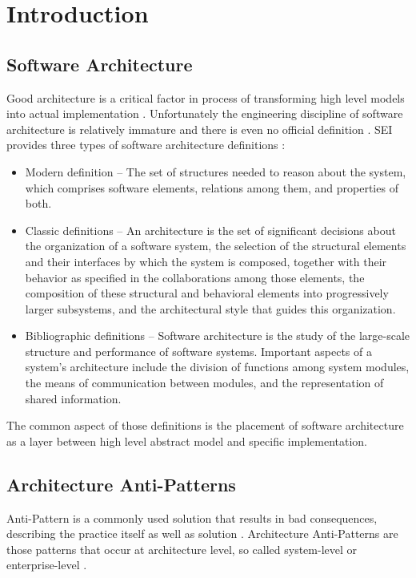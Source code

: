 \section{Introduction}


\subsection{Software Architecture}

Good architecture is a critical factor in process of transforming high level models into actual implementation \cite{Nordic}. Unfortunately the engineering discipline of software architecture is relatively immature and there is even no official definition \cite{ArchitekturaWikiPl}.
SEI provides three types of software architecture definitions \cite{SEI}:
\begin{itemize}
    \item Modern definition -- The set of structures needed to reason about the system, which comprises software elements, relations among them, and properties of both.
    \item Classic definitions -- An architecture is the set of significant decisions about the organization of a software system, the selection of the structural elements and their interfaces by which the system is composed, together with their behavior as specified in the collaborations among those elements, the composition of these structural and behavioral elements into progressively larger subsystems, and the architectural style that guides this organization.
    \item Bibliographic definitions -- Software architecture is the study of the large-scale structure and performance of software systems. Important aspects of a system's architecture include the division of functions among system modules, the means of communication between modules, and the representation of shared information.
\end{itemize}
The common aspect of those definitions is the placement of software architecture as a layer between high level abstract model and specific implementation.


\subsection{Architecture Anti-Patterns}

Anti-Pattern is a commonly used solution that results in bad consequences, describing the practice itself as well as solution \cite{PatternsAndSoftware}.
Architecture Anti-Patterns are those patterns that occur at architecture level, so called system-level or enterprise-level \cite{SurvivalGuide}.

